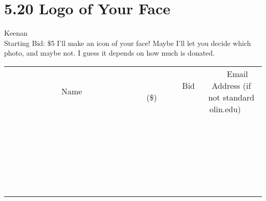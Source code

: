 \documentclass[11pt]{article}
\begin{document}
\section*{5.20 Logo of Your Face}
Keenan
\\
Starting Bid: \$5
\newline
I'll make an icon of your face! Maybe I'll let you decide which photo, and maybe not. I guess it depends on how much is donated.
\\[6ex]
\begin{tabular}{c c c}
~~~~~~~~~~~~~Name~~~~~~~~~~~~~ & ~~~~~~~~~Bid (\$)~~~~~~~~~  & ~~~Email Address (if not standard olin.edu)~~~\\
 & & \\
\hline
 & & \\
\hline
 & & \\
\hline
 & & \\
\hline
 & & \\
\hline
 & & \\
\hline
 & & \\
\hline
 & & \\
\hline
 & & \\
\hline
 & & \\
\hline
 & & \\
\hline
 & & \\
\hline
 & & \\
\hline
 & & \\
\hline
 & & \\
\hline
 & & \\
\hline
 & & \\
\hline
 & & \\
\hline
 & & \\
\hline
 & & \\
\hline
 & & \\
\hline
 & & \\
\hline
 & & \\
\hline
 & & \\
\hline
 & & \\
\hline
 & & \\
\hline
\end{tabular}
\newpage
\end{document}
